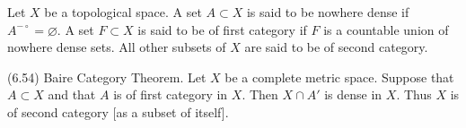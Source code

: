 Let $X$ be a topological space. A set $A \subset X$ is said to be nowhere dense if $A^{-\circ} = \varnothing$. A set $F \subset X$ is said to be of first category if $F$ is a countable union of nowhere dense sets. All other subsets of $X$ are said to be of second category.

(6.54) Baire Category Theorem. Let $X$ be a complete metric space. Suppose that $A \subset X$ and that $A$ is of first category in $X$. Then $X \cap A'$ is dense in $X$. Thus $X$ is of second category [as a subset of itself].